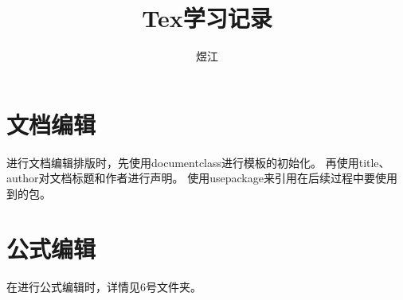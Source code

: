 \documentclass{ctexart}
\title{Tex学习记录}
\author{煜江}
\begin{document}
    \maketitle
    
    \section{文档编辑}
    进行文档编辑排版时，先使用documentclass进行模板的初始化。
    再使用title、author对文档标题和作者进行声明。
    使用usepackage来引用在后续过程中要使用到的包。

    \section{公式编辑}
    在进行公式编辑时，详情见6号文件夹。
\end{document}
